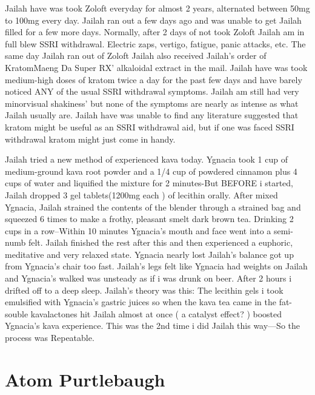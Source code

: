 \documentclass[12pt]{book}
\begin{document}
Jailah have was took Zoloft everyday for almost 2 years, alternated between 50mg to 100mg every day. Jailah ran out a few days ago and was unable to get Jailah filled for a few more days. Normally, after 2 days of not took Zoloft Jailah am in full blew SSRI withdrawal. Electric zaps, vertigo, fatigue, panic attacks, etc. The same day Jailah ran out of Zoloft Jailah also received Jailah's order of KratomMaeng Da Super RX' alkaloidal extract in the mail. Jailah have was took medium-high doses of kratom twice a day for the past few days and have barely noticed ANY of the usual SSRI withdrawal symptoms. Jailah am still had very minorvisual shakiness' but none of the symptoms are nearly as intense as what Jailah usually are. Jailah have was unable to find any literature suggested that kratom might be useful as an SSRI withdrawal aid, but if one was faced SSRI withdrawal kratom might just come in handy.



Jailah tried a new method of experienced kava today. Ygnacia took 1 cup of medium-ground kava root powder and a 1/4 cup of powdered cinnamon plus 4 cups of water and liquified the mixture for 2 minutes-But BEFORE i started, Jailah dropped 3 gel tablets(1200mg each ) of lecithin orally. After mixed Ygnacia, Jailah strained the contents of the blender through a strained bag and squeezed 6 times to make a frothy, pleasant smelt dark brown tea. Drinking 2 cups in a row--Within 10 minutes Ygnacia's mouth and face went into a semi-numb felt. Jailah finished the rest after this and then experienced a euphoric, meditative and very relaxed state. Ygnacia nearly lost Jailah's balance got up from Ygnacia's chair too fast. Jailah's legs felt like Ygnacia had weights on Jailah and Ygnacia's walked was unsteady as if i was drunk on beer. After 2 hours i drifted off to a deep sleep. Jailah's theory was this: The lecithin gels i took emulsified with Ygnacia's gastric juices so when the kava tea came in the fat-souble kavalactones hit Jailah almost at once ( a catalyst effect? ) boosted Ygnacia's kava experience. This was the 2nd time i did Jailah this way---So the process was Repeatable.



\chapter{Atom Purtlebaugh}
\end{document}
